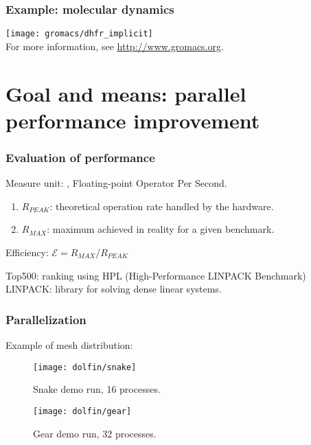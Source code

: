 \begin{frame}
  \frametitle{Example: molecular dynamics}
  \begin{center}
    \texttt{[image: gromacs/dhfr\_implicit]} \\
    For more information, see \url{http://www.gromacs.org}.
  \end{center}
\end{frame}

\section{Goal and means: parallel performance improvement}

\begin{frame}
  \frametitle{Evaluation of performance}

Measure unit: \SI{}{\flop}, Floating-point Operator Per Second.

\vspace{2ex}

\begin{enumerate}
\item $R_{PEAK}$: theoretical operation rate handled by the hardware.
\item $R_{MAX}$: maximum achieved in reality for a given benchmark.
\end{enumerate}

\begin{center}
Efficiency: $\mathcal{E} = R_{MAX} / R_{PEAK}$
\end{center}

Top500: ranking using HPL (High-Performance LINPACK Benchmark)
LINPACK: library for solving dense linear systems.

\end{frame}

\begin{frame}
  \frametitle{Parallelization}

Example of mesh distribution:
\begin{center}
   \begin{minipage}[bc]{0.48\linewidth}
   \centering
   \begin{figure}
    \centering
    \texttt{[image: dolfin/snake]}
    \caption{\label{fig:snake} Snake demo run, 16 processes.}
\end{figure}
   \end{minipage}
   \hfill
   \begin{minipage}[bc]{0.48\linewidth}
   \centering
   \begin{figure}
    \centering
    \texttt{[image: dolfin/gear]}
    \caption{\label{fig:gear} Gear demo run, 32 processes.}
    \end{figure}
   \end{minipage}
\end{center}

\end{frame}

